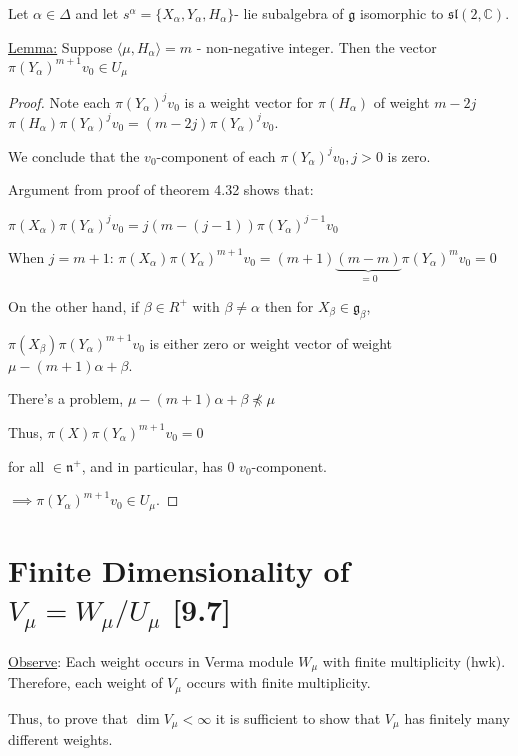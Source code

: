 \documentclass{article}
\theoremstyle{definition}
\begin{document}
Let \(\alpha \in \Delta\) and let \(s^\alpha = \{ X_\alpha , Y_\alpha , H_\alpha  \} \)- lie subalgebra of \(\mathfrak{g} \) isomorphic to \(\mathfrak{sl}(2,\mathbb{C})\).

\underline{Lemma:} Suppose \(\langle \mu, H_\alpha \rangle = m\) - non-negative integer. Then the vector \(\pi(Y_\alpha)^{m+1}v_0\in U_\mu\)

\begin{proof}
    Note each \(\pi(Y_\alpha)^j v_0\) is a weight vector for \(\pi(H_\alpha)\) of weight \(m-2j\) \(\pi(H_\alpha)\pi(Y_\alpha)^j v_0 = (m - 2j)\pi(Y_\alpha)^j v_0\).
    
    We conclude that the \(v_0\)-component of each \(\pi(Y_\alpha)^j v_0, j > 0\) is zero.
    
    Argument from proof of theorem 4.32 shows that:

    \(\pi(X_\alpha)\pi(Y_\alpha)^j v_0 = j(m-(j-1))\pi(Y_\alpha)^{j-1}v_0\)
    
    When \(j=m+1\): \(\pi(X_\alpha)\pi(Y_\alpha)^{m+1}v_0 = (m+1)\underbrace{(m-m)}_{=0}\pi(Y_\alpha)^m v_0 = 0\)
    
    On the other hand, if \(\beta \in R^+\) with \(\beta \neq \alpha\) then for \(X_\beta\in \mathfrak{g}_\beta\), 
    
    \(\pi(X_\beta)\pi(Y_\alpha)^{m+1}v_0\) is either zero or weight vector of weight \(\mu - (m+1)\alpha + \beta\).
    
    There's a problem, \(\mu - (m+1)\alpha + \beta \not \preceq \mu\)
    
    Thus, \(\pi(X)\pi(Y_\alpha)^{m+1}v_0 = 0\)
    
    for all \(\in \mathfrak{n}^+\), and in particular, has \(0\) \(v_0\)-component.
    
    \(\implies \pi(Y_\alpha)^{m+1}v_0\in U_\mu\).

\end{proof}

\section*{Finite Dimensionality of \(V_\mu = W_\mu / U_\mu\) [9.7]}

\underline{Observe}: Each weight occurs in Verma module \(W_\mu\) with finite multiplicity (hwk). Therefore, each weight of \(V_\mu\) occurs with finite multiplicity.

Thus, to prove that \(\dim V_\mu < \infty\) it is sufficient to show that \(V_\mu\) has finitely many different weights. 
\end{document}
